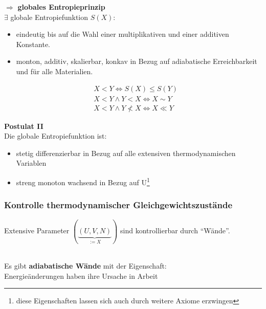 \documentclass[10pt]{scrartcl}
\begin{document}
$\Rightarrow$ \textbf{globales Entropieprinzip}\\
$\exists$ globale Entropiefunktion $S(X)$:
\begin{itemize}
\item eindeutig bis auf die Wahl einer multiplikativen und einer additiven Konstante.
\item monton, additiv, skalierbar, konkav in Bezug auf adiabatische Erreichbarkeit und für alle Materialien.
\end{itemize}
\begin{fleqn}
\begin{equation}
\begin{aligned}
&X<Y \Leftrightarrow S(X) \leq S(Y)\\
&X<Y \wedge Y<X \Leftrightarrow X \sim Y\\
&X<Y \wedge Y\not<X \Leftrightarrow X \ll Y
\end{aligned}
\end{equation}
\end{fleqn}
\textbf{Postulat II}\\
Die globale Entropiefunktion ist:
\begin{itemize}
\item stetig differenzierbar in Bezug auf alle extensiven thermodynamischen Variablen
\item streng monoton wachsend in Bezug auf U\footnote{diese Eigenschaften lassen sich auch durch weitere Axiome erzwingen}
\end{itemize}
\subsubsection{Kontrolle thermodynamischer Gleichgewichtszustände}
 \begin{doublespacing}Extensive Parameter $(\underbrace{(U,V,N)}_{:=X})$ sind kontrollierbar durch ``Wände''.\end{doublespacing}\\
 Es gibt \textbf{adiabatische Wände} mit der Eigenschaft:\\
 Energieänderungen haben ihre Ursache in Arbeit
\end{document}
